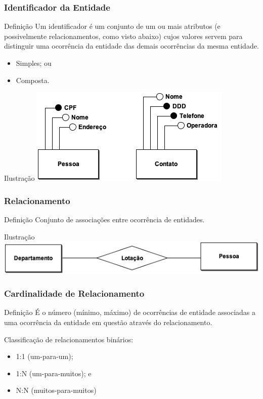 \documentclass{beamer}
\begin{document}
\begin{frame}
\frametitle{Identificador da Entidade}

\begin{block}{Definição}
	Um identificador é um conjunto de um ou mais atributos (e possivelmente
	relacionamentos, como visto abaixo) cujos valores servem para distinguir
	uma ocorrência da entidade das demais ocorrências da mesma entidade.
\end{block} \vfill

\begin{itemize}
	\item Simples; ou
	\item Composta.
\end{itemize} \vfill

\begin{exampleblock}{Ilustração}
	\centering
	\includegraphics[scale=2]{img/atributo-identificado}
\end{exampleblock}
\end{frame}

\begin{frame}
\frametitle{Relacionamento}

\begin{block}{Definição}
	Conjunto de associações entre ocorrência de entidades.
\end{block}\vfill

\begin{exampleblock}{Ilustração}
	\centering
	\includegraphics[scale=2.5]{img/relacionamento}
\end{exampleblock}
\end{frame}

\begin{frame}
\frametitle{Cardinalidade de Relacionamento}

\begin{block}{Definição}
É o número (mínimo, máximo) de ocorrências de entidade associadas a
uma ocorrência da entidade em questão através do relacionamento.
\end{block} \vfill

	Classificação de relacionamentos binários:
	\begin{itemize}
	\item 1:1 (um-para-um);
	\item 1:N (um-para-muitos); e
	\item N:N (muitos-para-muitos)
	\end{itemize}
\end{frame}
\end{document}
